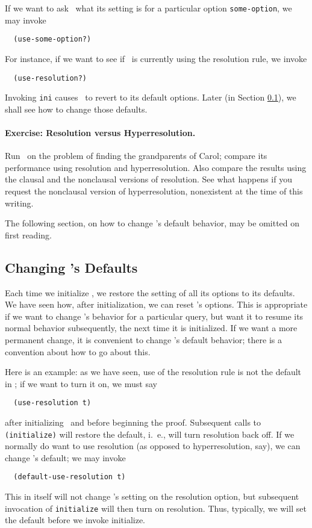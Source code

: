 If we want to ask \snark\  what its setting is for a particular option
{\tt some-option},
we may invoke
\begin{verbatim}
  (use-some-option?)
\end{verbatim}
For instance, if we want to see if \snark\  is currently using the
resolution rule, we invoke
\begin{verbatim}
  (use-resolution?)
\end{verbatim}

Invoking {\tt ini}  causes \snark\  to revert to
its default options.   Later (in Section \ref{subsec-change-default}),
we shall see how to change those defaults.

\paragraph{Exercise: Resolution versus Hyperresolution.}
Run \snark\  on the problem of finding the grandparents of Carol;
compare its performance using resolution and hyperresolution. Also
compare the results using the clausal and the nonclausal versions of
resolution.  See what happens if you request the nonclausal
version of hyperresolution, nonexistent at the time of this writing.

The following section, on how to change \snark\/'s default behavior, may be
omitted on first reading.

\subsection{Changing \Snark\/'s Defaults}
\label{subsec-change-default}



Each time we initialize \snark\/, we restore the setting of all its
options to its defaults.  We have seen how, after initialization, we
can reset \snark\/'s options.  This is appropriate if we want to
change \snark\/'s behavior for a particular query, but want it to
resume its normal behavior subsequently, the next time it is
initialized.  If we want a more permanent change, it is convenient to
change \snark\/'s default behavior; there is a convention about how to go
about this.

Here is an example: as we have seen, use of the resolution rule is not
the default in \snark\/; if we want to turn it on, we must say
\begin{verbatim}
  (use-resolution t)
\end{verbatim}
after initializing \snark\  and before beginning the proof.  Subsequent
calls to \verb|(initialize)| will restore the default, i.\  e., will turn
resolution back off.  If we normally do want to use resolution (as
opposed to hyperresolution, say), we can change \snark\/'s default; we may
invoke
\begin{verbatim}
  (default-use-resolution t)
\end{verbatim}
This in itself will not change \snark\/'s setting on the resolution
option, but subsequent invocation of {\tt initialize} will then turn
on resolution.  Thus, typically, we will set the default before we
invoke initialize.

